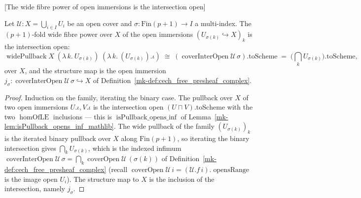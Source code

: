 \begin{lemma}

[The wide fibre power of open immersions is the intersection open]
  \label{mk-lem:widePullback_openImm_inter}

  Let \(\mathcal{U} : X = \bigcup_{i \in I} U_i\) be an open cover and
  \(\sigma : \mathrm{Fin}(p+1) \to I\) a multi-index. The \((p+1)\)-fold wide fibre power over
  \(X\) of the open immersions \((U_{\sigma(k)} \hookrightarrow X)_{k}\) is the intersection open:
  \[
    \operatorname{widePullback} X \;(\lambda\,k.\ U_{\sigma(k)})\;(\lambda\,k.\ (U_{\sigma(k)}).\iota)
      \;\cong\;
    (\operatorname{coverInterOpen}\mathcal{U}\,\sigma).\mathrm{toScheme}
      \;=\; \bigl(\textstyle\bigcap_k U_{\sigma(k)}\bigr).\mathrm{toScheme},
  \]
  over \(X\), and the structure map is the open immersion
  \(j_\sigma : \operatorname{coverInterOpen}\mathcal{U}\,\sigma \hookrightarrow X\) of
  Definition~\ref{mk-def:cech_free_presheaf_complex}.
\end{lemma}
\begin{proof}
  Induction on the family, iterating the binary case. The pullback over \(X\) of two open
  immersions \(U.\iota, V.\iota\) is the intersection open \((U \sqcap V).\mathrm{toScheme}\) with
  the two \(\operatorname{homOfLE}\) inclusions --- this is
  \(\operatorname{isPullback\_opens\_inf}\) of Lemma~\ref{mk-lem:isPullback_opens_inf_mathlib}. The
  wide pullback of the family \((U_{\sigma(k)})_{k}\) is the iterated binary pullback over \(X\)
  along \(\mathrm{Fin}(p+1)\), so iterating the binary intersection gives
  \(\bigcap_k U_{\sigma(k)}\), which is the indexed infimum
  \(\operatorname{coverInterOpen}\mathcal{U}\,\sigma = \bigcap_k \operatorname{coverOpen}
  \mathcal{U}\,(\sigma(k))\) of Definition~\ref{mk-def:cech_free_presheaf_complex} (recall
  \(\operatorname{coverOpen}\mathcal{U}\,i = (\mathcal{U}.f\,i).\operatorname{opensRange}\) is the
  image open \(U_i\)). The structure map to \(X\) is the inclusion of the intersection, namely
  \(j_\sigma\).
\end{proof}

